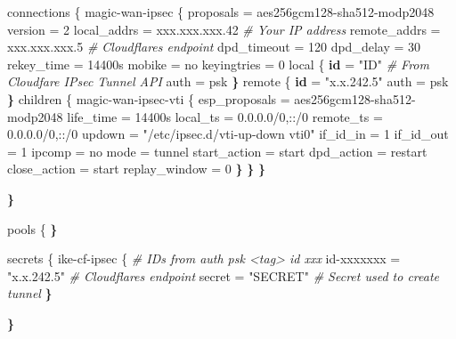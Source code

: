 \documentclass[
]{article}
\newenvironment{Shaded}{\begin{snugshade}}{\end{snugshade}}
\newcommand{\BuiltInTok}[1]{#1}
\newcommand{\CommentTok}[1]{\textcolor[rgb]{0.56,0.35,0.01}{\textit{#1}}}
\newcommand{\ErrorTok}[1]{\textcolor[rgb]{0.64,0.00,0.00}{\textbf{#1}}}
\newcommand{\ExtensionTok}[1]{#1}
\newcommand{\FunctionTok}[1]{\textcolor[rgb]{0.13,0.29,0.53}{\textbf{#1}}}
\newcommand{\NormalTok}[1]{#1}
\newcommand{\StringTok}[1]{\textcolor[rgb]{0.31,0.60,0.02}{#1}}
\begin{document}
\begin{Shaded}
\begin{Highlighting}[numbers=left,,]
\ExtensionTok{connections}\NormalTok{ \{}
    \ExtensionTok{magic{-}wan{-}ipsec}\NormalTok{ \{}
        \ExtensionTok{proposals}\NormalTok{ = aes256gcm128{-}sha512{-}modp2048}
        \ExtensionTok{version}\NormalTok{ = 2}
        \ExtensionTok{local\_addrs}\NormalTok{ = xxx.xxx.xxx.42 }\CommentTok{\# Your IP address}
        \ExtensionTok{remote\_addrs}\NormalTok{ = xxx.xxx.xxx.5 }\CommentTok{\# Cloudflare\textquotesingle{}s endpoint}
        \ExtensionTok{dpd\_timeout}\NormalTok{ = 120}
        \ExtensionTok{dpd\_delay}\NormalTok{ = 30}
        \ExtensionTok{rekey\_time}\NormalTok{ = 14400s}
        \ExtensionTok{mobike}\NormalTok{ = no}
        \ExtensionTok{keyingtries}\NormalTok{ = 0}
        \BuiltInTok{local}\NormalTok{ \{}
            \FunctionTok{id}\NormalTok{ = }\StringTok{"ID"} \CommentTok{\# From Cloudfare IPsec Tunnel API}
            \ExtensionTok{auth}\NormalTok{ = psk}
        \ErrorTok{\}}
        \ExtensionTok{remote}\NormalTok{ \{}
            \FunctionTok{id}\NormalTok{ = }\StringTok{"x.x.242.5"}
            \ExtensionTok{auth}\NormalTok{ = psk}
        \ErrorTok{\}}
        \ExtensionTok{children}\NormalTok{ \{}
            \ExtensionTok{magic{-}wan{-}ipsec{-}vti}\NormalTok{ \{}
                \ExtensionTok{esp\_proposals}\NormalTok{ = aes256gcm128{-}sha512{-}modp2048}
                \ExtensionTok{life\_time}\NormalTok{ = 14400s}
                \ExtensionTok{local\_ts}\NormalTok{ = 0.0.0.0/0,::/0}
                \ExtensionTok{remote\_ts}\NormalTok{ = 0.0.0.0/0,::/0}
                \ExtensionTok{updown}\NormalTok{ = }\StringTok{"/etc/ipsec.d/vti{-}up{-}down vti0"}
                \ExtensionTok{if\_id\_in}\NormalTok{ = 1}
                \ExtensionTok{if\_id\_out}\NormalTok{ = 1}
                \ExtensionTok{ipcomp}\NormalTok{ = no}
                \ExtensionTok{mode}\NormalTok{ = tunnel}
                \ExtensionTok{start\_action}\NormalTok{ = start}
                \ExtensionTok{dpd\_action}\NormalTok{ = restart}
                \ExtensionTok{close\_action}\NormalTok{ = start}
                \ExtensionTok{replay\_window}\NormalTok{ = 0}
            \ErrorTok{\}}
        \ErrorTok{\}}
    \ErrorTok{\}}

\ErrorTok{\}}

\ExtensionTok{pools}\NormalTok{ \{}
\ErrorTok{\}}

\ExtensionTok{secrets}\NormalTok{ \{}
    \ExtensionTok{ike{-}cf{-}ipsec}\NormalTok{ \{}
        \CommentTok{\# ID\textquotesingle{}s from auth psk \textless{}tag\textgreater{} id xxx}
        \ExtensionTok{id{-}xxxxxxx}\NormalTok{ = }\StringTok{"x.x.242.5"} \CommentTok{\# Cloudflare\textquotesingle{}s endpoint}
        \ExtensionTok{secret}\NormalTok{ = }\StringTok{"SECRET"} \CommentTok{\# Secret used to create tunnel}
    \ErrorTok{\}}

\ErrorTok{\}}
\end{Highlighting}
\end{Shaded}
\end{document}
